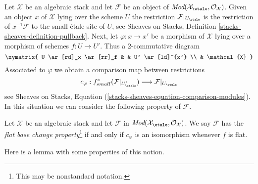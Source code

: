 \noindent
Let $\mathcal{X}$ be an algebraic stack and let $\mathcal{F}$ be an object
of $\textit{Mod}(\mathcal{X}_\etale, \mathcal{O}_\mathcal{X})$.
Given an object $x$ of $\mathcal{X}$ lying over the scheme $U$ the
restriction $\mathcal{F}|_{U_\etale}$ is the restriction of
$x^{-1}\mathcal{F}$ to the small \'etale site of $U$, see
Sheaves on Stacks, Definition \ref{stacks-sheaves-definition-pullback}.
Next, let $\varphi : x \to x'$ be a morphism of $\mathcal{X}$ lying
over a morphism of schemes $f : U \to U'$. Thus a $2$-commutative diagram
$$
\xymatrix{
U \ar[rd]_x \ar[rr]_f & & U' \ar[ld]^{x'} \\
& \mathcal{X}
}
$$
Associated to $\varphi$ we obtain a comparison map between restrictions
\begin{equation}
\label{equation-comparison-modules}
c_\varphi :
f_{small}^*(\mathcal{F}|_{U'_\etale})
\longrightarrow
\mathcal{F}|_{U_\etale}
\end{equation}
see Sheaves on Stacks, Equation
(\ref{stacks-sheaves-equation-comparison-modules}).
In this situation we can consider the following property
of $\mathcal{F}$.

\begin{definition}
\label{definition-flat-base-change}
Let $\mathcal{X}$ be an algebraic stack and let $\mathcal{F}$ in
$\textit{Mod}(\mathcal{X}_\etale, \mathcal{O}_\mathcal{X})$.
We say $\mathcal{F}$ has the {\it flat base change property}\footnote{This
may be nonstandard notation.}
if and only if $c_\varphi$ is an isomorphism whenever $f$ is flat.
\end{definition}

\noindent
Here is a lemma with some properties of this notion.

